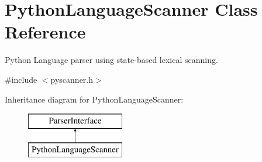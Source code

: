 \hypertarget{class_python_language_scanner}{}\section{Python\+Language\+Scanner Class Reference}
\label{class_python_language_scanner}


Python Language parser using state-\/based lexical scanning.  




{\ttfamily \#include $<$pyscanner.\+h$>$}

Inheritance diagram for Python\+Language\+Scanner\+:\begin{figure}[H]
\begin{center}
\leavevmode
\includegraphics[height=2.000000cm]{class_python_language_scanner}
\end{center}
\end{figure}
